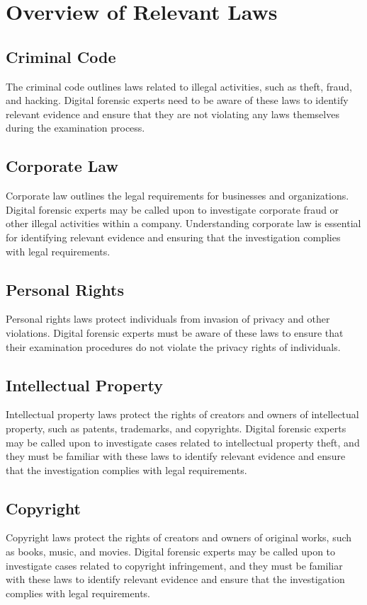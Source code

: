 \documentclass{scrreprt}
\begin{document}
\section{Overview of Relevant Laws}
\subsection{Criminal Code}
The criminal code outlines laws related to illegal activities, such as theft, fraud, and hacking. Digital forensic experts need to be aware of these laws to identify relevant evidence and ensure that they are not violating any laws themselves during the examination process.
\subsection{Corporate Law}
Corporate law outlines the legal requirements for businesses and organizations. Digital forensic experts may be called upon to investigate corporate fraud or other illegal activities within a company. Understanding corporate law is essential for identifying relevant evidence and ensuring that the investigation complies with legal requirements.
\subsection{Personal Rights}
Personal rights laws protect individuals from invasion of privacy and other violations. Digital forensic experts must be aware of these laws to ensure that their examination procedures do not violate the privacy rights of individuals.
\subsection{Intellectual Property}
Intellectual property laws protect the rights of creators and owners of intellectual property, such as patents, trademarks, and copyrights. Digital forensic experts may be called upon to investigate cases related to intellectual property theft, and they must be familiar with these laws to identify relevant evidence and ensure that the investigation complies with legal requirements.
\subsection{Copyright}
Copyright laws protect the rights of creators and owners of original works, such as books, music, and movies. Digital forensic experts may be called upon to investigate cases related to copyright infringement, and they must be familiar with these laws to identify relevant evidence and ensure that the investigation complies with legal requirements.
\end{document}
